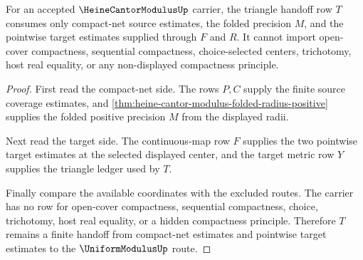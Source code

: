 \begin{theorem}
\label{thm:heine-cantor-modulus-triangle-fold-nonescape}
For an accepted $\HeineCantorModulusUp$ carrier, the triangle handoff row $T$
consumes only compact-net source estimates, the folded precision $M$, and the
pointwise target estimates supplied through $F$ and $R$. It cannot import
open-cover compactness, sequential compactness, choice-selected centers,
trichotomy, host real equality, or any non-displayed compactness principle.
\end{theorem}
\begin{proof}
First read the compact-net side. The rows $P,C$ supply the finite source
coverage estimates, and
\autoref{thm:heine-cantor-modulus-folded-radius-positive} supplies the folded
positive precision $M$ from the displayed radii.

Next read the target side. The continuous-map row $F$ supplies the two
pointwise target estimates at the selected displayed center, and the target
metric row $Y$ supplies the triangle ledger used by $T$.

Finally compare the available coordinates with the excluded routes. The
carrier has no row for open-cover compactness, sequential compactness, choice,
trichotomy, host real equality, or a hidden compactness principle. Therefore
$T$ remains a finite handoff from compact-net estimates and pointwise target
estimates to the $\UniformModulusUp$ route.
\end{proof}

